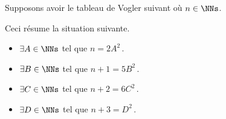 \begin{example}
	Supposons avoir le tableau de Vogler suivant où $n \in \NNs$.

	\begin{center}
	\end{center}
	
	Ceci résume la situation suivante. 
	
	\vspace{-1ex}
	\begin{multicols}{2}
	\begin{itemize}
		\item $\exists A \in \NNs$ tel que $n     = 2 A^2$\,.

		\item $\exists B \in \NNs$ tel que $n + 1 = 5 B^2$\,.

		\item $\exists C \in \NNs$ tel que $n + 2 = 6 C^2$\,.

		\item $\exists D \in \NNs$ tel que $n + 3 =   D^2$\,.
	\end{itemize}
	\end{multicols}
\end{example}




